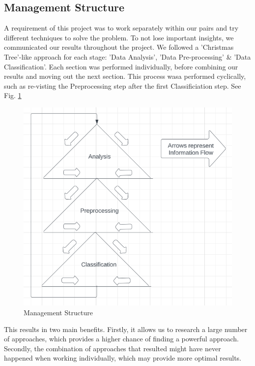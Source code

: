 \documentclass[conference]{IEEEtran}
\begin{document}
\subsection{Management Structure}

A requirement of this project was to work separately within our pairs and try different techniques to solve the problem. To not lose important insights, we communicated our results throughout the project. We followed a 'Christmas Tree'-like approach for each stage: 'Data Analysis', 'Data Pre-processing' \& 'Data Classification'. Each section was performed individually, before combining our results and moving out the next section. This process wasa performed cyclically, such as re-visting the Preprocessing step after the first Classificiation step. See Fig. \ref{fig:management_structure}

\begin{figure}[h]
    \centering
    \includegraphics[scale=0.35]{figures/ct_approach.png}
    \caption{Management Structure}
    \label{fig:management_structure}
\end{figure}

This results in two main benefits. Firstly, it allows us to research a large number of approaches, which provides a higher chance of finding a powerful approach. Secondly, the combination of approaches that resulted might have never happened when working individually, which may provide more optimal results. 
\end{document}
